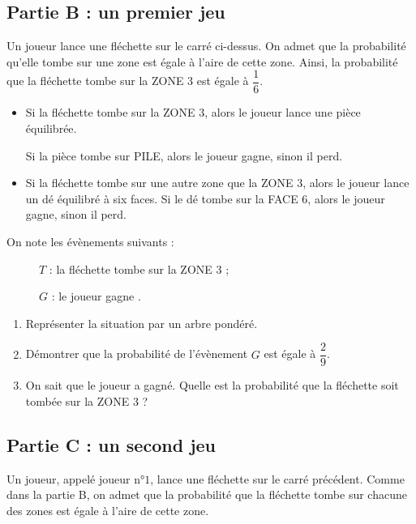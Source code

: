 \documentclass[10pt]{article}
\providecommand{\no}{{\text{n°}}}
\begin{document}
\subsection*{Partie B : un premier jeu}

Un joueur lance une fléchette sur le carré ci-dessus. On admet que la probabilité qu'elle tombe sur une zone est égale à l'aire de cette zone. Ainsi, la probabilité que la fléchette tombe sur la ZONE 3 est égale à $\dfrac{1}{6}$.

\begin{itemize}[label=$\bullet~~$]
\item Si la fléchette tombe sur la ZONE 3, alors le joueur lance une pièce équilibrée.

Si la pièce tombe sur PILE, alors le joueur gagne, sinon il perd.
\item Si la fléchette tombe sur une autre zone que la ZONE 3, alors le joueur lance un dé équilibré à six faces. Si le dé tombe sur la FACE 6, alors le joueur gagne, sinon il perd.
\end{itemize}

\medskip

On note les évènements suivants :

\begin{description}
\item[ ] $T$ : \og la fléchette tombe sur la ZONE 3 \fg{} ;
\item[ ] $G$ : \og le joueur gagne \fg.
\end{description}

\medskip

\begin{enumerate}
\item Représenter la situation par un arbre pondéré.
\item Démontrer que la probabilité de l'évènement $G$ est égale à $\dfrac{2}{9}$.
\item On sait que le joueur a gagné. Quelle est la probabilité que la fléchette soit tombée sur la ZONE 3 ?
\end{enumerate}

\subsection*{Partie C : un second jeu}

Un joueur, appelé joueur $\no 1$, lance une fléchette sur le carré précédent. Comme dans la partie B, on admet que la probabilité que la fléchette tombe sur chacune des zones est égale à l'aire de cette zone.
\end{document}
